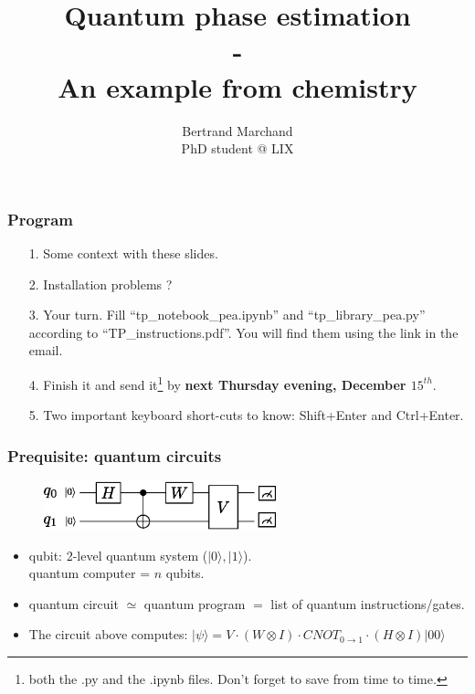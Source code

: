 \documentclass{beamer}
\title{Quantum phase estimation \\-\\ An example from chemistry}
\author{Bertrand Marchand \\PhD student @ LIX}
\begin{document}
\frame{\titlepage}

\begin{frame}
\frametitle{Program}

\begin{itemize}
\item[1.] Some context with these slides.
\item[2.] Installation problems ?
\item[3.] Your turn. Fill ``tp\_notebook\_pea.ipynb'' and  ``tp\_library\_pea.py'' according to ``TP\_instructions.pdf''. You will find them using the link in the email.
\item[4.] Finish it and send it\footnote{both the .py and the .ipynb files. Don't forget to save from time to time.} 
    by \textbf{next Thursday evening, December $15^{th}$}.
\item[5.] Two important keyboard short-cuts to know: Shift+Enter and Ctrl+Enter.
\end{itemize}

\end{frame}

\begin{frame}
\frametitle{Prequisite: quantum circuits}

\begin{center}
\begin{figure}
\includegraphics[width=0.6\textwidth]{quantum_circuit_example.eps}
\end{figure}
\end{center}
\begin{itemize}
\item qubit: 2-level quantum system ($|0\rangle, |1\rangle$). \\ quantum computer = $n$ qubits.
\item quantum circuit $\simeq$ quantum program $=$ list of quantum instructions/gates.
\item The circuit above computes: $|\psi\rangle = V \cdot (W\otimes I) \cdot CNOT_{0\rightarrow 1} \cdot (H\otimes I) |00\rangle$
\end{itemize}

 
\end{frame}
\end{document}
